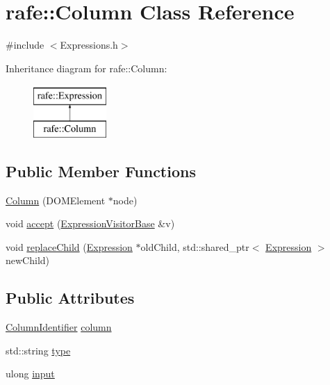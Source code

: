 \hypertarget{classrafe_1_1_column}{\section{rafe\+:\+:Column Class Reference}
\label{classrafe_1_1_column}
}


{\ttfamily \#include $<$Expressions.\+h$>$}

Inheritance diagram for rafe\+:\+:Column\+:\begin{figure}[H]
\begin{center}
\leavevmode
\includegraphics[height=2.000000cm]{classrafe_1_1_column}
\end{center}
\end{figure}
\subsection*{Public Member Functions}
\begin{DoxyCompactItemize}
\item 
\hyperlink{classrafe_1_1_column_a040c4db6ffc5c18a2df387beacdcddc8}{Column} (D\+O\+M\+Element $\ast$node)
\item 
void \hyperlink{classrafe_1_1_column_addd58ca5abdbba013b744ee6a96de75d}{accept} (\hyperlink{classrafe_1_1_expression_visitor_base}{Expression\+Visitor\+Base} \&v)
\item 
void \hyperlink{classrafe_1_1_column_a420f51cd25221b94cbc0dcb7391ee950}{replace\+Child} (\hyperlink{classrafe_1_1_expression}{Expression} $\ast$old\+Child, std\+::shared\+\_\+ptr$<$ \hyperlink{classrafe_1_1_expression}{Expression} $>$ new\+Child)
\end{DoxyCompactItemize}
\subsection*{Public Attributes}
\begin{DoxyCompactItemize}
\item 
\hyperlink{classrafe_1_1_column_identifier}{Column\+Identifier} \hyperlink{classrafe_1_1_column_a7d991e6ad44729235c31910dcc885c5d}{column}
\item 
std\+::string \hyperlink{classrafe_1_1_column_a3e812878630c51153a69f372b1472ce6}{type}
\item 
ulong \hyperlink{classrafe_1_1_column_a1d4d38a6c74a83602c193c5a51f20780}{input}
\end{DoxyCompactItemize}
